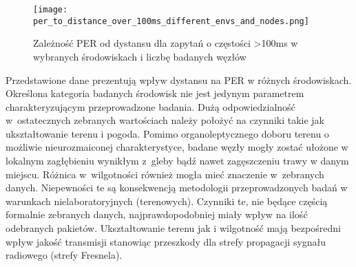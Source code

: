 \begin{figure}[!htb]
	\centering \texttt{[image: per\_to\_distance\_over\_100ms\_different\_envs\_and\_nodes.png]}
	\caption{Zależność \gls{PER} od dystansu dla zapytań o częstości >100ms w wybranych środowiskach i liczbę badanych węzłów}
	\label{rys:per_to_distance_over_100ms_different_envs_and_nodes}
\end{figure}


Przedstawione dane prezentują wpływ dystansu na PER w różnych środowiskach. Określona kategoria badanych środowisk nie jest jedynym
parametrem charakteryzującym przeprowadzone badania. Dużą odpowiedzialność w~ostatecznych zebranych wartościach należy położyć
na czynniki takie jak ukształtowanie terenu i pogoda. Pomimo organoleptycznego doboru terenu o możliwie nieurozmaiconej charakterystyce,
badane węzły mogły zostać ułożone w lokalnym zagłębieniu wynikłym z~gleby bądź nawet zagęszczeniu trawy w danym miejscu. Różnica
w~wilgotności również mogła mieć znaczenie w~zebranych danych. Niepewności te są konsekwencją metodologii przeprowadzonych
badań w warunkach nielaboratoryjnych (terenowych). Czynniki te, nie będące częścią formalnie zebranych danych, najprawdopodobniej
miały wpływ na ilość odebranych pakietów. Ukształtowanie terenu jak i wilgotność mają bezpośredni wpływ jakość transmisji stanowiąc
przeszkody dla strefy propagacji sygnału radiowego (strefy Fresnela).


